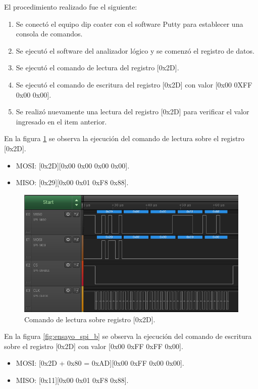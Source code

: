 El procedimiento realizado fue el siguiente:
\begin{enumerate}
\item Se conectó el equipo dip coater con el software Putty para establecer una consola de comandos.
\item Se ejecutó el software del analizador lógico y se comenzó el registro de datos.
\item Se ejecutó el comando de lectura del registro [0x2D].
\item Se ejecutó el comando de escritura del registro [0x2D] con valor [0x00 0XFF 0x00 0x00].
\item Se realizó nuevamente una lectura del registro [0x2D] para verificar el valor ingresado en el item anterior. 
\end{enumerate}


En la figura \ref{fig:ensayo_spi_a} se observa la ejecución del comando de lectura sobre el registro [0x2D]. 
\begin{itemize}
\item MOSI: [0x2D][0x00 0x00 0x00 0x00].
\item MISO: [0x29][0x00 0x01 0xF8 0x88].
\end{itemize}



\begin{figure}[h]
\centering 
\includegraphics[width=1\textwidth]{./Figures/ensayo_spi_a.png}
\caption{Comando de lectura sobre registro [0x2D].}
\label{fig:ensayo_spi_a}
\end{figure}


En la figura \ref{fig:ensayo_spi_b} se observa la ejecución del comando de escritura sobre el registro [0x2D] con valor [0x00 0xFF 0xFF 0x00]. 

\begin{itemize}
\item MOSI: [0x2D + 0x80 = 0xAD][0x00 0xFF 0x00 0x00].
\item MISO: [0x11][0x00 0x01 0xF8 0x88].
\end{itemize}



